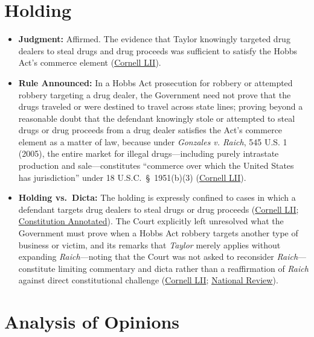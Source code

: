 \documentclass[12pt]{article}
\begin{document}
\section{Holding}
\begin{itemize}
\item \textbf{Judgment:} Affirmed. The evidence that Taylor knowingly targeted drug dealers to steal drugs and drug proceeds was sufficient to satisfy the Hobbs Act's commerce element (\href{https://www.law.cornell.edu/supremecourt/text/14-6166}{Cornell LII}).
\item \textbf{Rule Announced:} In a Hobbs Act prosecution for robbery or attempted robbery targeting a drug dealer, the Government need not prove that the drugs traveled or were destined to travel across state lines; proving beyond a reasonable doubt that the defendant knowingly stole or attempted to steal drugs or drug proceeds from a drug dealer satisfies the Act's commerce element as a matter of law, because under \textit{Gonzales v. Raich}, 545 U.S. 1 (2005), the entire market for illegal drugs---including purely intrastate production and sale---constitutes ``commerce over which the United States has jurisdiction'' under 18 U.S.C.\ \S~1951(b)(3) (\href{https://www.law.cornell.edu/supremecourt/text/14-6166}{Cornell LII}).
\item \textbf{Holding vs.\ Dicta:} The holding is expressly confined to cases in which a defendant targets drug dealers to steal drugs or drug proceeds (\href{https://www.law.cornell.edu/supremecourt/text/14-6166}{Cornell LII}; \href{https://www.law.cornell.edu/constitution-conan/article-1/section-8/clause-3/limits-on-federal-regulation-of-intrastate-activity}{Constitution Annotated}). The Court explicitly left unresolved what the Government must prove when a Hobbs Act robbery targets another type of business or victim, and its remarks that \textit{Taylor} merely applies without expanding \textit{Raich}---noting that the Court was not asked to reconsider \textit{Raich}---constitute limiting commentary and dicta rather than a reaffirmation of \textit{Raich} against direct constitutional challenge (\href{https://www.law.cornell.edu/supremecourt/text/14-6166}{Cornell LII}; \href{https://www.nationalreview.com/bench-memos/loose-evidentiary-ends-raich-taylor-v-united-states}{National Review}).
\end{itemize}

\section{Analysis of Opinions}
\end{document}
